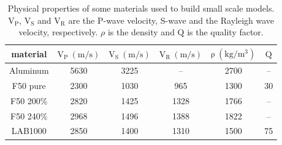 \documentclass[manuscript,revised]{geophysics}
\begin{document}
\begin{table}[!ht]
	\centering
	\begin{tabular}{cccccc}
		\hline
		material & $\mathrm{V_{P}\ (m/s)}$ & $\mathrm{V_{S}\ (m/s)}$ & $\mathrm{V_{R}\ (m/s)}$ & $\mathrm{\rho\ (kg/m^{3})}$ & $\mathrm{Q}$ \\
		\hline
		Aluminum & 5630 & 3225 & --   & 2700 & --  \\
		F50 pure  & 2300 & 1030 & 965  & 1300 & 30  \\
		F50 200\% & 2820 & 1425 & 1328 & 1766 & --  \\
		F50 240\% & 2968 & 1496 & 1388 & 1822 & --  \\
		LAB1000   & 2850 & 1400 & 1310 & 1500 & 75  \\
		\hline
	\end{tabular}
	\caption{Physical properties of some materials used to build small scale models. $\mathrm{V_{P}}$, $\mathrm{V_{S}}$ and $\mathrm{V_{R}}$ are the P-wave velocity, S-wave and the Rayleigh wave velocity, respectively. $\rho$ is the density and $\mathrm{Q}$ is the quality factor.}
	\label{epoxy-resin}
\end{table}

%		
\end{document}

